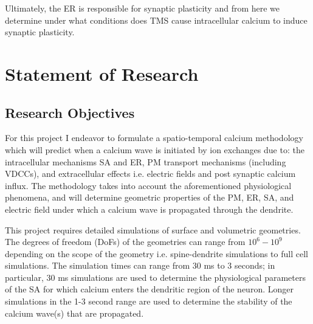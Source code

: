 \documentclass[12pt]{article}
\begin{document}
Ultimately, the ER is responsible for synaptic plasticity \cite{Breit2018} and from here we determine under what conditions does TMS cause intracellular calcium to induce synaptic plasticity.

\section{Statement of Research}
\subsection*{Research Objectives}
For this project I endeavor to formulate a spatio-temporal calcium methodology which will predict when a calcium wave is initiated by ion exchanges due to: the intracellular mechanisms  SA and ER, PM transport mechanisms (including VDCCs), and extracellular effects i.e. electric fields and post synaptic calcium influx. The methodology takes into account the aforementioned physiological phenomena, and will determine geometric properties of the PM, ER, SA, and electric field under which a calcium wave is propagated through the dendrite.%

This project requires detailed simulations of surface and volumetric geometries. The degrees of freedom (DoFs) of the geometries can range from $10^6-10^9$ depending on the scope of the geometry i.e. spine-dendrite simulations to full cell simulations. The simulation times can range from 30 ms to 3 seconds; in particular, 30 ms simulations are used to determine the physiological parameters of the SA for which  calcium enters the dendritic region of the neuron. Longer simulations in the 1-3 second range are used to determine the stability of the calcium wave(s) that are propagated.
\end{document}
